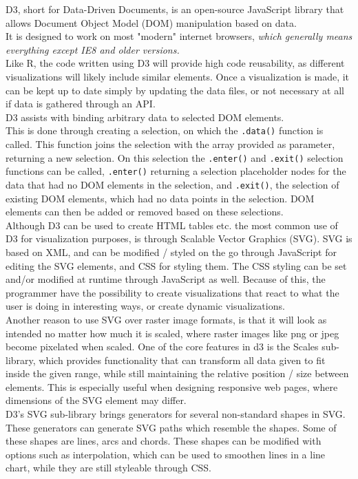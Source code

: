 \documentclass[Report.tex]{subfiles}
\begin{document}
	D3, short for Data-Driven Documents, is an open-source JavaScript library that allows Document Object Model (DOM) manipulation based on data.\\
	It is designed to work on most "modern" internet browsers, \textit{which generally means everything except IE8 and older versions.} \cite[Browser / Platform Support]{D3W}\\
	
	Like R, the code written using D3 will provide high code reusability, as different visualizations will likely include similar elements. Once a visualization is made, it can be kept up to date simply by updating the data files, or not necessary at all if data is gathered through an API.\\ 
	D3 assists with binding arbitrary data to selected DOM elements.\\ This is done through creating a selection, on which the \texttt{.data()} function is called. This function joins the selection with the array provided as parameter, returning a new selection. On this selection the \texttt{.enter()} and \texttt{.exit()} selection functions can be called, \texttt{.enter()} returning a selection placeholder nodes for the data that had no DOM elements in the selection, and \texttt{.exit()}, the selection of existing DOM elements, which had no data points in the selection. DOM elements can then be added or removed based on these selections.\\
	Although D3 can be used to create HTML tables etc. the most common use of D3 for visualization purposes, is through Scalable Vector Graphics (SVG).
	SVG is based on XML, and can be modified / styled on the go through JavaScript for editing the SVG elements, and CSS for styling them. The CSS styling can be set and/or modified at runtime through JavaScript as well. Because of this, the programmer have the possibility to create visualizations that react to what the user is doing in interesting ways, or create dynamic visualizations.\\
	Another reason to use SVG over raster image formats, is that it will look as intended no matter how much it is scaled, where raster images like png or jpeg become pixelated when scaled.
	One of the core features in d3 is the Scales sub-library, which provides functionality that can transform all data given to fit inside the given range, while still maintaining the relative position / size between elements.
	This is especially useful when designing responsive web pages, where dimensions of the SVG element may differ.\\
	D3's SVG sub-library brings generators for several non-standard shapes in SVG. These generators can generate SVG paths which resemble the shapes. Some of these shapes are lines, arcs and chords. These shapes can be modified with options such as interpolation, which can be used to smoothen lines in a line chart, while they are still styleable through CSS.\\
	
\end{document}
